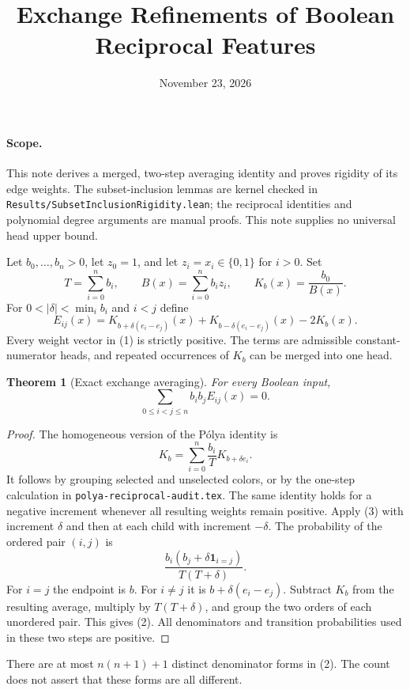 \documentclass[11pt]{article}
\title{Exchange Refinements of Boolean Reciprocal Features}
\author{}
\date{November 23, 2026}
\newtheorem{theorem}{Theorem}
\begin{document}
\maketitle

\paragraph{Scope.}
This note derives a merged, two-step averaging identity and proves
rigidity of its edge weights. The subset-inclusion lemmas are kernel
checked in \texttt{Results/SubsetInclusionRigidity.lean}; the reciprocal
identities and polynomial degree arguments are manual proofs. This note
supplies no universal head upper bound.

Let $b_0,\ldots,b_n>0$, let $z_0=1$, and let $z_i=x_i\in\{0,1\}$
for $i>0$. Set
\[
 T=\sum_{i=0}^n b_i,\qquad B(x)=\sum_{i=0}^n b_i z_i,
 \qquad K_b(x)=\frac{b_0}{B(x)}.
\]
For $0<|\delta|<\min_i b_i$ and $i<j$ define
\[
 E_{ij}(x)=K_{b+\delta(e_i-e_j)}(x)
          +K_{b-\delta(e_i-e_j)}(x)-2K_b(x).
 \tag{1}
\]
Every weight vector in (1) is strictly positive. The terms are
admissible constant-numerator heads, and repeated occurrences of
$K_b$ can be merged into one head.

\begin{theorem}[Exact exchange averaging]
For every Boolean input,
\[
                  \sum_{0\le i<j\le n} b_i b_j E_{ij}(x)=0.
 \tag{2}
\]
\end{theorem}
\begin{proof}
The homogeneous version of the P\'olya identity is
\[
 K_b=\sum_{i=0}^n\frac{b_i}{T}K_{b+\delta e_i}.
 \tag{3}
\]
It follows by grouping selected and unselected colors, or by the
one-step calculation in \texttt{polya-reciprocal-audit.tex}.
The same identity holds for a negative increment whenever all
resulting weights remain positive. Apply (3) with increment $\delta$
and then at each child with increment $-\delta$. The probability
of the ordered pair $(i,j)$ is
\[
 \frac{b_i(b_j+\delta\mathbf1_{i=j})}{T(T+\delta)}.
\]
For $i=j$ the endpoint is $b$. For $i\ne j$ it is
$b+\delta(e_i-e_j)$. Subtract $K_b$ from the resulting average,
multiply by $T(T+\delta)$, and group the two orders of each
unordered pair. This gives (2). All denominators and transition
probabilities used in these two steps are positive.
\end{proof}

There are at most $n(n+1)+1$ distinct denominator forms in (2).
The count does not assert that these forms are all different.
\end{document}
